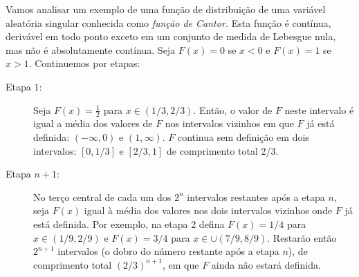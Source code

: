 \begin{frame}	
	
\begin{exem}

Vamos analisar um exemplo de uma função de distribuição de uma variável aleatória singular conhecida como {\em função de Cantor.} Esta função é contínua, derivável em todo ponto exceto em um conjunto de medida de Lebesgue nula, mas não é absolutamente contínua. Seja $F(x)=0$ se $x<0$ e $F(x)=1$ se $x>1$. Continuemos por etapas:

\begin{description}
\item[Etapa $1$:] Seja $F(x)=\frac{1}{2}$ para $x\in(1/3,2/3)$. Então, o valor de $F$ neste intervalo é igual a média dos valores de $F$ nos intervalos vizinhos em que $F$ já está definida: $(-\infty,0)$ e $(1,\infty)$. $F$ continua sem definição em dois intervalos: $[0,1/3]$ e $[2/3,1]$ de comprimento total 2/3.\\

\item[Etapa $n+1$:] No terço central de cada um dos $2^n$ intervalos restantes após a etapa $n$, seja $F(x)$ igual à média dos valores nos dois intervalos vizinhos onde $F$ já está definida. Por exemplo, na etapa 2 defina $F(x)=1/4$ para $x\in(1/9,2/9)$ e $F(x)=3/4$ para $x\in\cup(7/9,8/9)$. Restarão então $2^{n+1}$ intervalos (o dobro do número restante após a etapa $n$), de comprimento total $(2/3)^{n+1}$, em que $F$ ainda não estará definida.
\end{description}

\end{exem}
\end{frame}
%
